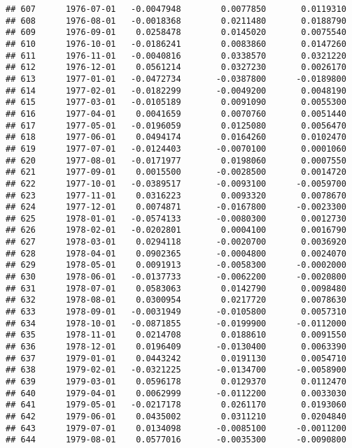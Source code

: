 \documentclass[
]{article}
\begin{document}
\begin{verbatim}
## 607      1976-07-01   -0.0047948        0.0077850       0.0119310
## 608      1976-08-01   -0.0018368        0.0211480       0.0188790
## 609      1976-09-01    0.0258478        0.0145020       0.0075540
## 610      1976-10-01   -0.0186241        0.0083860       0.0147260
## 611      1976-11-01   -0.0040816        0.0338570       0.0321220
## 612      1976-12-01    0.0561214        0.0327230       0.0026170
## 613      1977-01-01   -0.0472734       -0.0387800      -0.0189800
## 614      1977-02-01   -0.0182299       -0.0049200       0.0048190
## 615      1977-03-01   -0.0105189        0.0091090       0.0055300
## 616      1977-04-01    0.0041659        0.0070760       0.0051440
## 617      1977-05-01   -0.0196059        0.0125080       0.0056470
## 618      1977-06-01    0.0494174        0.0164260       0.0102470
## 619      1977-07-01   -0.0124403       -0.0070100       0.0001060
## 620      1977-08-01   -0.0171977        0.0198060       0.0007550
## 621      1977-09-01    0.0015500       -0.0028500       0.0014720
## 622      1977-10-01   -0.0389517       -0.0093100      -0.0059700
## 623      1977-11-01    0.0316223        0.0093320       0.0078670
## 624      1977-12-01    0.0074871       -0.0167800      -0.0023300
## 625      1978-01-01   -0.0574133       -0.0080300       0.0012730
## 626      1978-02-01   -0.0202801        0.0004100       0.0016790
## 627      1978-03-01    0.0294118       -0.0020700       0.0036920
## 628      1978-04-01    0.0902365       -0.0004800       0.0024070
## 629      1978-05-01    0.0091913       -0.0058300      -0.0002000
## 630      1978-06-01   -0.0137733       -0.0062200      -0.0020800
## 631      1978-07-01    0.0583063        0.0142790       0.0098480
## 632      1978-08-01    0.0300954        0.0217720       0.0078630
## 633      1978-09-01   -0.0031949       -0.0105800       0.0057310
## 634      1978-10-01   -0.0871855       -0.0199900      -0.0112000
## 635      1978-11-01    0.0214708        0.0188610       0.0091550
## 636      1978-12-01    0.0196409       -0.0130400       0.0063390
## 637      1979-01-01    0.0443242        0.0191130       0.0054710
## 638      1979-02-01   -0.0321225       -0.0134700      -0.0058900
## 639      1979-03-01    0.0596178        0.0129370       0.0112470
## 640      1979-04-01    0.0062999       -0.0112200       0.0033030
## 641      1979-05-01   -0.0217178        0.0261170       0.0193060
## 642      1979-06-01    0.0435002        0.0311210       0.0204840
## 643      1979-07-01    0.0134098       -0.0085100      -0.0011200
## 644      1979-08-01    0.0577016       -0.0035300      -0.0090800

\end{verbatim}
\end{document}
